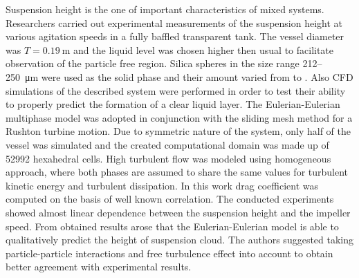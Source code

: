 Suspension height is the one of important characteristics of mixed systems. Researchers \citet{mic04} carried out experimental measurements of the suspension height at various agitation speeds in a fully baffled transparent tank. The vessel diameter was $T=\SI{0.19}{\meter}$ and the liquid level was chosen higher then usual to facilitate observation of the particle free region. Silica spheres in the size range \num{212}--\SI{250}{\micro\meter} were used as the solid phase and their amount varied from  to . Also CFD simulations of the described system were performed in order to test their ability to properly predict the formation of a clear liquid layer. The Eulerian-Eulerian multiphase model was adopted in conjunction with the sliding mesh method for a Rushton turbine motion. Due to symmetric nature of the system, only half of the vessel was simulated and the created computational domain was made up of \num{52992} hexahedral cells. High turbulent flow was modeled using homogeneous \keps{} approach, where both phases are assumed to share the same values for turbulent kinetic energy and turbulent dissipation. In this work drag coefficient was computed on the basis of well known \citet{schi32} correlation. The conducted experiments showed almost linear dependence between the suspension height and the impeller speed. From obtained results arose that the Eulerian-Eulerian model is able to qualitatively predict the height of suspension cloud. The authors suggested taking particle-particle interactions and free turbulence effect into account to obtain better agreement with experimental results.                 
